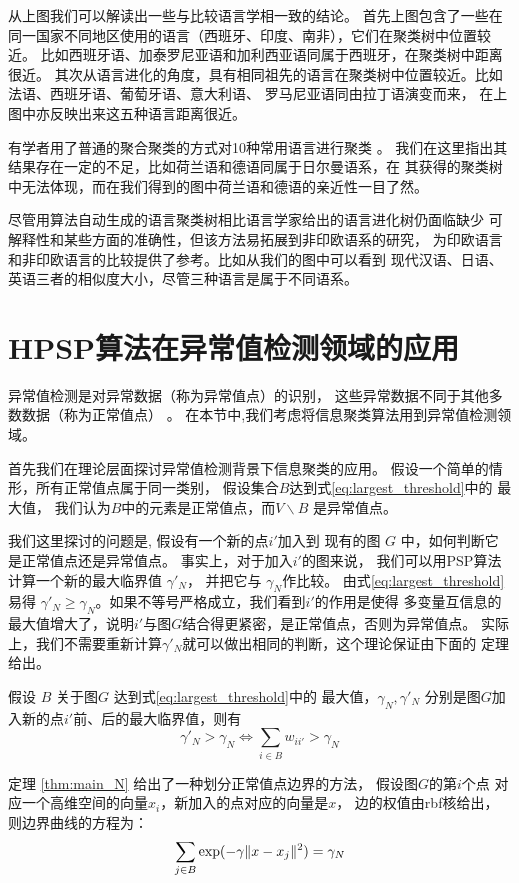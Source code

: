 从上图我们可以解读出一些与比较语言学相一致的结论。
首先上图包含了一些在同一国家不同地区使用的语言（西班牙、印度、南非），它们在聚类树中位置较近。
比如西班牙语、加泰罗尼亚语和加利西亚语同属于西班牙，在聚类树中距离很近。
其次从语言进化的角度，具有相同祖先的语言在聚类树中位置较近。比如法语、西班牙语、葡萄牙语、意大利语、
罗马尼亚语同由拉丁语演变而来，
在上图中亦反映出来这五种语言距离很近。

有学者用了普通的聚合聚类的方式对10种常用语言进行聚类 \cite{al2017characterization} 。
我们在这里指出其结果存在一定的不足，比如荷兰语和德语同属于日尔曼语系，在
其获得的聚类树中无法体现，而在我们得到的图中荷兰语和德语的亲近性一目了然。

尽管用算法自动生成的语言聚类树相比语言学家给出的语言进化树仍面临缺少
可解释性和某些方面的准确性，但该方法易拓展到非印欧语系的研究，
为印欧语言和非印欧语言的比较提供了参考。比如从我们的图中可以看到
现代汉语、日语、英语三者的相似度大小，尽管三种语言是属于不同语系。



\section{HPSP算法在异常值检测领域的应用}
异常值检测是对异常数据（称为异常值点）的识别，
这些异常数据不同于其他多数数据（称为正常值点）
\citep{grubbs1969procedures}。
在本节中,我们考虑将信息聚类算法用到异常值检测领域。

首先我们在理论层面探讨异常值检测背景下信息聚类的应用。
假设一个简单的情形，所有正常值点属于同一类别，
假设集合$B$达到式\eqref{eq:largest_threshold}中的
最大值，
我们认为$B$中的元素是正常值点，而$V\backslash B$ 是异常值点。

我们这里探讨的问题是, 假设有一个新的点$i'$加入到
现有的图 $G$ 中，如何判断它是正常值点还是异常值点。 
事实上，对于加入$i'$的图来说，
我们可以用PSP算法计算一个新的最大临界值
$\gamma'_N$，
并把它与 $\gamma_N$作比较。 由式\eqref{eq:largest_threshold}易得
$\gamma'_N \geq \gamma_N$。如果不等号严格成立，我们看到$i'$的作用是使得
多变量互信息的最大值增大了，说明$i'$与图$G$结合得更紧密，是正常值点，否则为异常值点。
实际上，我们不需要重新计算$\gamma'_N$就可以做出相同的判断，这个理论保证由下面的
定理给出。
\begin{theorem}\label{thm:main_N}
  假设 $B$ 关于图$G$ 达到式\eqref{eq:largest_threshold}中的
  最大值，$\gamma_N, \gamma'_N$ 分别是图$G$加入新的点$i'$前、后的最大临界值，则有
\begin{equation}
\gamma'_N > \gamma_N \iff  \sum_{i \in B} w_{ii'} > \gamma_N 
\end{equation}
\end{theorem}
定理 \ref{thm:main_N} 给出了一种划分正常值点边界的方法，
假设图$G$的第$i$个点
对应一个高维空间的向量$x_i$，新加入的点对应的向量是$x$，
边的权值由rbf核给出，则边界曲线的方程为：
\begin{equation}\label{eq:sum_exp_gamma_N}
  \sum_{j \in B} \exp(-\gamma \lVert x - x_j\rVert^2)= \gamma_N
\end{equation}

